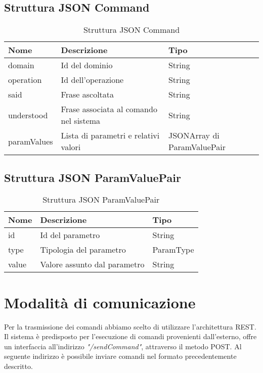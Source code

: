 \documentclass[twoside]{supsistudent}
\begin{document}
\subsection{Struttura JSON Command}
\begin{table}[H]
\centering
\caption{Struttura JSON Command}
\label{Struttura JSON Command}
\begin{tabular}{|l|l|l|}
\hline
Nome            & Descrizione                            & Tipo                        \\ \hline
domain          & Id del dominio                         & String                      \\ \hline
operation       & Id dell'operazione                     & String                      \\ \hline
said            & Frase ascoltata                        & String                      \\ \hline
understood      & Frase associata al comando nel sistema & String                      \\ \hline
paramValues & Lista di parametri e relativi valori   & JSONArray di ParamValuePair \\ \hline
\end{tabular}
\end{table}
\subsection{Struttura JSON ParamValuePair}
\begin{table}[H]
\centering
\caption{Struttura JSON ParamValuePair}
\label{Struttura JSON ParamValuePair}
\begin{tabular}{|l|l|l|}
\hline
Nome  & Descrizione                  & Tipo      \\ \hline
id    & Id del parametro             & String    \\ \hline
type  & Tipologia del parametro      & ParamType \\ \hline
value & Valore assunto dal parametro & String    \\ \hline
\end{tabular}
\end{table}
\section{Modalità di comunicazione}
Per la trasmissione dei comandi abbiamo scelto di utilizzare l'architettura REST.
Il sistema è predisposto per l'esecuzione di comandi provenienti dall'esterno, offre un interfaccia all'indirizzo  \textit{"/sendCommand"}, attraverso il metodo POST.
Al seguente indirizzo è possibile inviare comandi nel formato precedentemente descritto.
\end{document}
